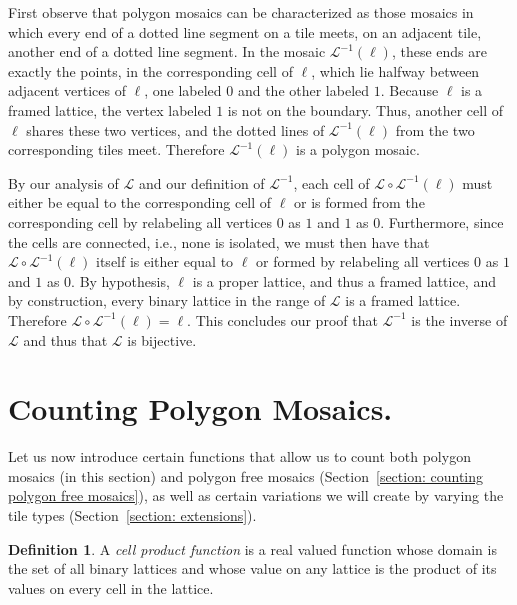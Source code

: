 \documentclass[12pt]{article}
\theoremstyle{plain}
\theoremstyle{remark}
\theoremstyle{definition}
\providecommand{\definitionname}{Definition}
\newtheorem*{defn*}{\protect\definitionname}
\theoremstyle{remark}
\theoremstyle{definition}
\begin{document}
First observe that polygon mosaics can be characterized as those mosaics in which every end of a dotted line segment on a tile meets, on an adjacent tile, another end of a dotted line segment. In the mosaic $\mathscr{L}^{-1}\left(\ell\right)$, these ends are exactly the points, in the corresponding cell of $\ell$, which lie halfway between adjacent vertices of $\ell$, one labeled $0$ and the other labeled $1$. Because $\ell$ is a framed lattice, the vertex labeled $1$ is not on the boundary. Thus, another cell of $\ell$ shares these two vertices, and the dotted lines of $\mathscr{L}^{-1}\left(\ell\right)$ from the two corresponding tiles meet. Therefore $\mathscr{L}^{-1}\left(\ell\right)$ is a polygon mosaic.

By our analysis of $\mathscr{L}$ and our definition of $\mathscr{L}^{-1}$, each cell of $\mathscr{L}\circ\mathscr{L}^{-1}\left(\ell\right)$ must either be equal to the corresponding cell of $\ell$ or is formed from the corresponding cell by relabeling all vertices $0$ as $1$ and $1$ as $0$. Furthermore, since the cells are connected, i.e., none is isolated, we must then have that $\mathscr{L}\circ\mathscr{L}^{-1}\left(\ell\right)$ itself is either equal to $\ell$ or formed by relabeling all vertices $0$ as $1$ and $1$ as $0$. By hypothesis, $\ell$ is a proper lattice, and thus a  framed lattice, and by construction, every binary lattice in the range of $\mathscr{L}$ is a framed lattice. Therefore $\mathscr{L}\circ\mathscr{L}^{-1}\left(\ell\right)=\ell$. This concludes our proof that $\mathscr{L}^{-1}$ is the inverse of $\mathscr{L}$ and thus that $\mathscr{L}$ is bijective.

\section{Counting Polygon Mosaics.}\label{section: counting polygon mosaics}

Let us now introduce certain functions that allow us to count both polygon mosaics (in this section) and polygon free mosaics (Section~\ref{section: counting polygon free mosaics}), as well as certain variations we will create by varying the tile types (Section~\ref{section: extensions}).

\begin{defn*}
A \emph{cell product function} is a real valued function whose domain is the set of all binary lattices and whose value on any lattice is the product of its values on every cell in the lattice.
\end{defn*}
\end{document}
